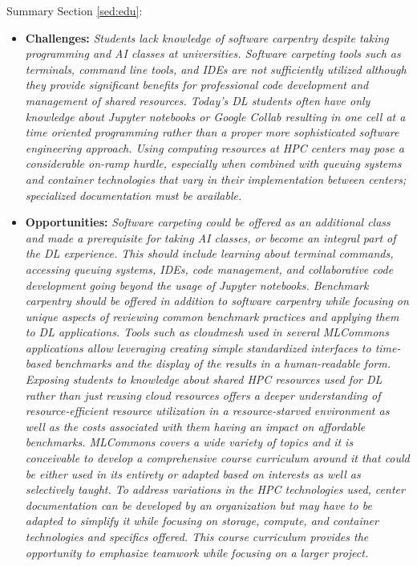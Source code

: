 \documentclass[utf8]{FrontiersinVancouver} %
\begin{document}
\begin{tcolorbox}
Summary Section \ref{sed:edu}:

\begin{itemize}

\item {\bf Challenges:} {\it Students lack knowledge of software carpentry despite taking programming and AI classes at universities. Software carpeting tools such as terminals, command line tools, and IDEs are not sufficiently utilized although they provide significant benefits for professional code development and management of shared resources. Today's DL students often have only knowledge about Jupyter notebooks or Google Collab resulting in one cell at a time oriented programming rather than a proper more sophisticated software engineering approach. Using computing resources at HPC centers may pose a considerable on-ramp hurdle, especially when combined with queuing systems and container technologies that vary in their implementation between centers; specialized documentation must be available.}
\item {\bf Opportunities:} {\it Software carpeting could be offered as an additional class and made a prerequisite for taking AI classes, or become an integral part of the DL experience. This should include learning about terminal commands, accessing queuing systems, IDEs, code management, and collaborative code development going beyond the usage of Jupyter notebooks. Benchmark carpentry should be offered in addition to software carpentry while focusing on unique aspects of reviewing common benchmark practices and applying them to DL applications. Tools such as cloudmesh used in several MLCommons applications allow leveraging creating simple standardized interfaces to time-based benchmarks and the display of the results in a human-readable form. Exposing students to knowledge about shared HPC resources used for DL rather than just reusing cloud resources offers a deeper understanding of resource-efficient resource utilization in a resource-starved environment as well as the costs associated with them having an impact on affordable benchmarks. MLCommons covers a wide variety of topics and it is conceivable to develop a comprehensive course curriculum around it that could be either used in its entirety or adapted based on interests as well as selectively taught. To address variations in the HPC technologies used, center documentation can be developed by an organization but may have to be adapted to simplify it while focusing on storage, compute, and container technologies and specifics offered. This course curriculum provides the opportunity to emphasize teamwork while focusing on a larger project.}

\end{itemize}

\end{tcolorbox}
\end{document}
